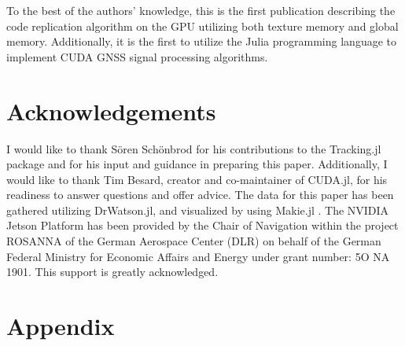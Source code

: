 \documentclass{juliacon}
\begin{document}
To the best of the authors' knowledge, this is the first publication describing the code replication algorithm on the GPU utilizing both texture memory and global memory. Additionally, it is the first to utilize the Julia programming language to implement CUDA GNSS signal processing algorithms.

\section*{Acknowledgements}
I would like to thank Sören Schönbrod for his contributions to the Tracking.jl package \cite{Schoenbrod2022} and for his input and guidance in preparing this paper. Additionally, I would like to thank Tim Besard, creator and co-maintainer of CUDA.jl, for his readiness to answer questions and offer advice. The data for this paper has been gathered utilizing DrWatson.jl, and visualized by using Makie.jl \cite{Datseris2020, Danisch2021}. The NVIDIA Jetson Platform has been provided by the Chair of Navigation within the project ROSANNA of the German Aerospace Center (DLR) on behalf of the German Federal Ministry for Economic Affairs and Energy under grant number: 5O NA 1901. This support is greatly acknowledged.



\newpage
\section*{Appendix}
\end{document}
